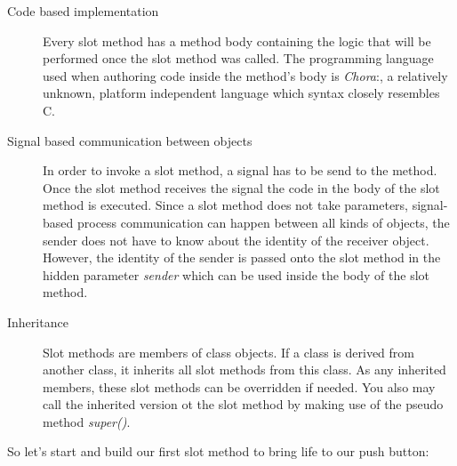 \documentclass[
  a4paper,
,tablecaptionabove
]{scrbook}
\begin{document}
\begin{description}
\item[Code based implementation]
Every slot method has a method body containing the logic that will be
performed once the slot method was called. The programming language used
when authoring code inside the method's body is \emph{Chora}:, a
relatively unknown, platform independent language which syntax closely
resembles C.
\item[Signal based communication between objects]
In order to invoke a slot method, a signal has to be send to the method.
Once the slot method receives the signal the code in the body of the
slot method is executed. Since a slot method does not take parameters,
signal-based process communication can happen between all kinds of
objects, the sender does not have to know about the identity of the
receiver object. However, the identity of the sender is passed onto the
slot method in the hidden parameter \emph{sender} which can be used
inside the body of the slot method.
\item[Inheritance]
Slot methods are members of class objects. If a class is derived from
another class, it inherits all slot methods from this class. As any
inherited members, these slot methods can be overridden if needed. You
also may call the inherited version ot the slot method by making use of
the pseudo method \emph{super()}.
\end{description}

So let's start and build our first slot method to bring life to our push
button:
\end{document}
